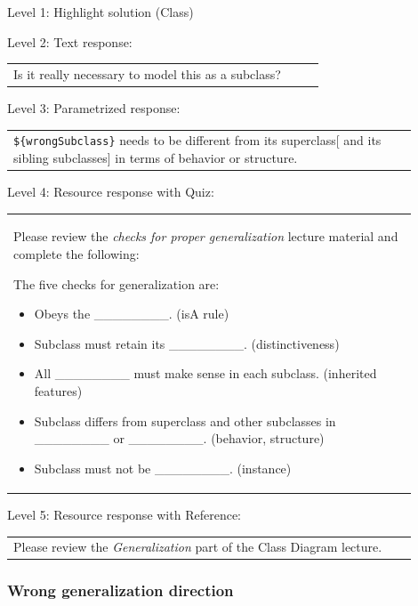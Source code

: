 \noindent Level 1: Highlight solution (Class) \medskip

\noindent Level 2: Text response: \medskip

\begin{tabular}{|p{0.9\linewidth}}
Is it really necessary to model this as a subclass?
\end{tabular} \medskip

\noindent Level 3: Parametrized response: \medskip

\begin{tabular}{|p{0.9\linewidth}}
\verb|${wrongSubclass}| needs to be different from its superclass[ and its sibling subclasses] in terms of behavior or structure.
\end{tabular} \medskip

\noindent Level 4: Resource response with Quiz: \medskip

\begin{tabular}{|p{0.9\linewidth}}
Please review the \textit{checks for proper generalization} lecture material
and complete the following:

The five checks for generalization are:
\begin{itemize}
    \item Obeys the \_\_\_\_\_\_\_\_. (isA rule)
    \item Subclass must retain its \_\_\_\_\_\_\_\_. (distinctiveness)
    \item All \_\_\_\_\_\_\_\_ must make sense in each subclass. (inherited features)
    \item Subclass differs from superclass and other subclasses in \_\_\_\_\_\_\_\_ or \_\_\_\_\_\_\_\_. (behavior, structure)
    \item Subclass must not be \_\_\_\_\_\_\_\_. (instance)
\end{itemize}

\end{tabular} \medskip

\noindent Level 5: Resource response with Reference: \medskip

\begin{tabular}{|p{0.9\linewidth}}
Please review the \textit{Generalization} part of the Class Diagram lecture.
\end{tabular} \medskip


\subsubsection{Wrong generalization direction}

